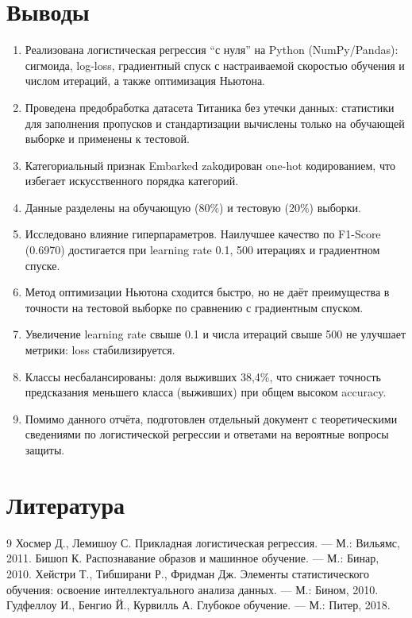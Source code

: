 \documentclass[12pt,a4paper]{article}
\begin{document}
\section{Выводы}
\begin{enumerate}
\item Реализована логистическая регрессия ``с нуля'' на Python (NumPy/Pandas): сигмоида, log-loss, градиентный спуск с настраиваемой скоростью обучения и числом итераций, а также оптимизация Ньютона.
\item Проведена предобработка датасета Титаника без утечки данных: статистики для заполнения пропусков и стандартизации вычислены только на обучающей выборке и применены к тестовой.
\item Категориальный признак Embarked zakодирован one-hot кодированием, что избегает искусственного порядка категорий.
\item Данные разделены на обучающую (80\%) и тестовую (20\%) выборки.
\item Исследовано влияние гиперпараметров. Наилучшее качество по F1-Score (0.6970) достигается при learning rate 0.1, 500 итерациях и градиентном спуске.
\item Метод оптимизации Ньютона сходится быстро, но не даёт преимущества в точности на тестовой выборке по сравнению с градиентным спуском.
\item Увеличение learning rate свыше 0.1 и числа итераций свыше 500 не улучшает метрики: loss стабилизируется.
\item Классы несбалансированы: доля выживших 38,4\%, что снижает точность предсказания меньшего класса (выживших) при общем высоком accuracy.
\item Помимо данного отчёта, подготовлен отдельный документ с теоретическими сведениями по логистической регрессии и ответами на вероятные вопросы защиты.
\end{enumerate}

\section{Литература}
\begin{thebibliography}{9}
 Хосмер Д., Лемишоу С. Прикладная логистическая регрессия. --- М.: Вильямс, 2011.
 Бишоп К. Распознавание образов и машинное обучение. --- М.: Бинар, 2010.
 Хейстри Т., Тибширани Р., Фридман Дж. Элементы статистического обучения: освоение интеллектуального анализа данных. --- М.: Бином, 2010.
 Гудфеллоу И., Бенгио Й., Курвилль А. Глубокое обучение. --- М.: Питер, 2018.
\end{thebibliography}
\end{document}
